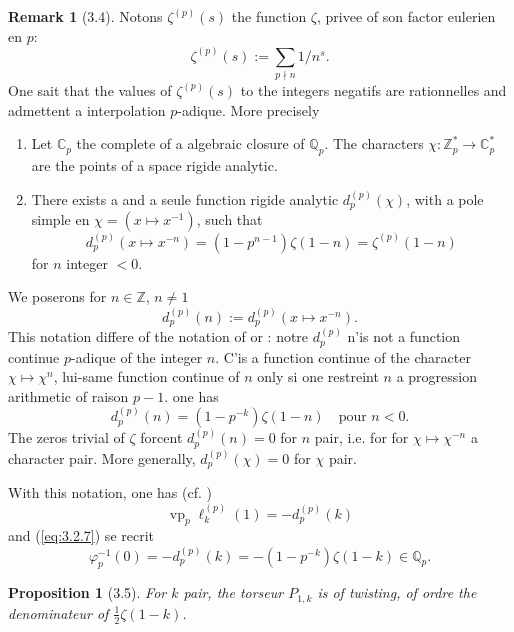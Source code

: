 \documentclass[12pt,a4paper]{article}
\theoremstyle{plain}
\newtheorem{proposition}[theorem]{Proposition}
\theoremstyle{definition}
\newtheorem{remark}[theorem]{Remark}
\theoremstyle{remark}
\begin{document}
\begin{remark}[3.4]\label{rem:3.4}
Notons $\zeta^{(p)}(s)$ the function $\zeta$, privee of son factor eulerien en $p$:
\[
\zeta^{(p)}(s) := \sum_{p \nmid n} 1/n^s.
\]
One sait that the values of $\zeta^{(p)}(s)$ to the integers negatifs are rationnelles and
admettent a interpolation $p$-adique. More precisely

\begin{enumerate}[label=(\alph*)]
\item Let $\mathbb{C}_p$ the complete of a algebraic closure of $\mathbb{Q}_p$.
The characters $\chi: \mathbb{Z}_p^* \to \mathbb{C}_p^*$ are the points of a space rigide
analytic.

\item There exists a and a seule function rigide analytic $d_p^{(p)}(\chi)$, with a
pole simple en $\chi = (x \mapsto x^{-1})$, such that
\[
d_p^{(p)}(x \mapsto x^{-n}) = (1-p^{n-1}) \zeta(1-n) = \zeta^{(p)}(1-n)
\]
for $n$ integer $< 0$.
\end{enumerate}

We poserons for $n \in \mathbb{Z}$, $n \neq 1$
\[
d_p^{(p)}(n) := d_p^{(p)}(x \mapsto x^{-n}).
\]
This notation differe of the notation of \cite{C} or \cite{Ko}: notre $d_p^{(p)}$ n'is not
a function continue $p$-adique of the integer $n$. C'is a function continue of the
character $\chi \mapsto \chi^n$, lui-same function continue of $n$ only si one
restreint $n$ a progression arithmetic of raison $p-1$. one has
\[
d_p^{(p)}(n) = (1-p^{-k}) \zeta(1-n) \quad \text{pour } n < 0.
\]
The zeros trivial of $\zeta$ forcent $d_p^{(p)}(n) = 0$ for $n$ pair, i.e. for for
$\chi \mapsto \chi^{-n}$ a character pair. More generally,
$d_p^{(p)}(\chi) = 0$ for $\chi$ pair.

With this notation, one has (cf. \cite{C}\cite{Ko})
\[
\operatorname{vp}_p \ell_k^{(p)}(1) = -d_p^{(p)}(k)
\]
and (\ref{eq:3.2.7}) se recrit
\begin{equation}\label{eq:3.4.1}
\varphi_p^{-1}(0) = -d_p^{(p)}(k) = -(1-p^{-k}) \zeta(1-k) \in \mathbb{Q}_p.
\end{equation}
\end{remark}

\begin{proposition}[3.5]\label{prop:3.5}
For $k$ pair, the torseur $P_{1,k}$ is of twisting, of ordre the denominateur of
$\frac{1}{2}\zeta(1-k)$.
\end{proposition}
\end{document}
